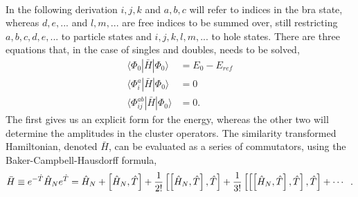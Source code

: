\paragraph*{}
In the following derivation $i,j,k$ and $a,b,c$ will refer to indices in the bra state, whereas 
$d,e,...$ and $l,m,...$ are free indices to be summed over, still restricting $a,b,c,d,e,...$ to particle states and $i,j,k,l,m,...$ to hole states.
There are three equations that, in the case of singles and doubles, needs to be solved,
\begin{equation}
\begin{split}
\langle \Phi_0 | \bar{H} | \Phi_0 \rangle &= E_0  - E_{ref} \\
\langle \Phi_{i}^a | \bar{H} | \Phi_0 \rangle &= 0 \\
\langle \Phi_{ij}^{ab} | \bar{H} | \Phi_0 \rangle &= 0 .
\end{split}
\end{equation}
The first gives us an explicit form for the energy, whereas the other two will determine the amplitudes in the cluster operators.
The similarity transformed Hamiltonian, denoted $\bar{H}$, can be evaluated as a series of commutators, using the Baker-Campbell-Hausdorff formula,
\begin{equation}
\label{eq:CC:BCH}
\bar{H} \equiv e^{-\hat{T}} \hat{H}_N e^{\hat{T}}
=
\hat{H}_N + \left[\hat{H}_N, \hat{T} \right]
+
\frac{1}{2!} \left[\left[\hat{H}_N, \hat{T}\right], \hat{T}\right]
+
\frac{1}{3!} \left[\left[\left[\hat{H}_N, \hat{T} \right], \hat{T}\right], \hat{T}\right] + \cdots\hspace{2mm}.
\end{equation}


